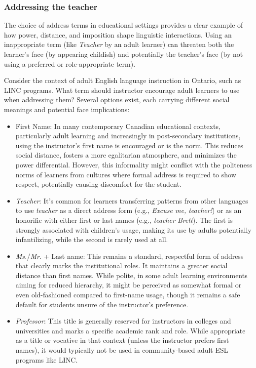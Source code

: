 \subsubsection*{Addressing the teacher}

The choice of address terms in educational settings provides a clear example of how power, distance, and imposition shape linguistic interactions. Using an inappropriate term (like \textit{Teacher} by an adult learner) can threaten both the learner's face (by appearing childish) and potentially the teacher's face (by not using a preferred or role-appropriate term).

Consider the context of adult English language instruction in Ontario, such as LINC programs. What term should instructor encourage adult learners to use when addressing them? Several options exist, each carrying different social meanings and potential face implications:

\begin{itemize}[noitemsep]
    \item First Name: In many contemporary Canadian educational contexts, particularly adult learning and increasingly in post-secondary institutions, using the instructor's first name is encouraged or is the norm. This reduces social distance, fosters a more egalitarian atmosphere, and minimizes the power differential. However, this informality might conflict with the politeness norms of learners from cultures where formal address is required to show respect, potentially causing discomfort for the student.
    
    \item \textit{Teacher}: It's common for learners transferring patterns from other languages to use \textit{teacher} as a direct address form (e.g., \textit{Excuse me, teacher!}) or as an honorific with either first or last names (e.g., \textit{teacher Brett}). The first is strongly associated with children's usage, making its use by adults potentially infantilizing, while the second is rarely used at all.

    \item \textit{Ms.}/\textit{Mr.} + Last name: This remains a standard, respectful form of address that clearly marks the institutional roles. It maintains a greater social distance than first names. While polite, in some adult learning environments aiming for reduced hierarchy, it might be perceived as somewhat formal or even old-fashioned compared to first-name usage, though it remains a safe default for students unsure of the instructor's preference.
    
    \item \textit{Professor}: This title is generally reserved for instructors in colleges and universities and marks a specific academic rank and role. While appropriate as a title or vocative in that context (unless the instructor prefers first names), it would typically not be used in community-based adult ESL programs like LINC.
\end{itemize}

